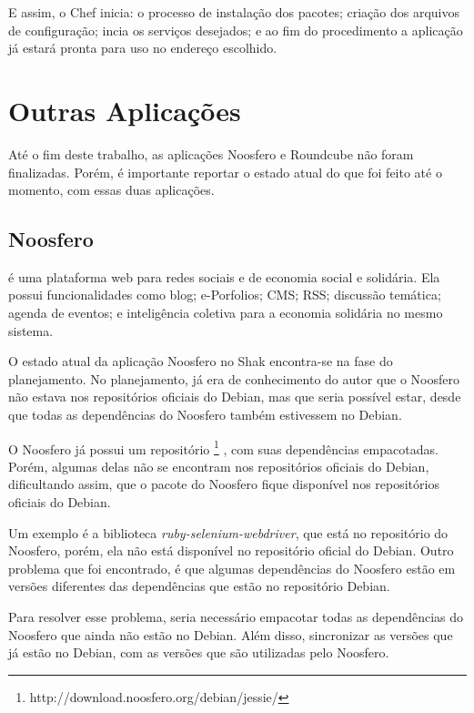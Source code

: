 E assim, o Chef inicia: o processo de instalação dos pacotes; criação dos arquivos
de configuração; incia os serviços desejados; e ao fim do procedimento a aplicação
já estará pronta para uso no endereço escolhido.

\section{Outras Aplicações}
\label{sub:appnencerradas}

Até o fim deste trabalho, as aplicações Noosfero e Roundcube não foram finalizadas. 
Porém, é importante reportar o estado atual do que foi feito até o momento,
com essas duas aplicações.

\subsection{Noosfero}
\label{subsub:noosfero}

 é uma plataforma web para redes sociais e 
de economia social e solidária. Ela possui funcionalidades como blog; e-Porfolios; 
CMS; RSS; discussão temática; agenda de eventos; e inteligência coletiva para a 
economia solidária no mesmo sistema.

O estado atual da aplicação Noosfero no Shak encontra-se
na fase do planejamento. No planejamento, já era de conhecimento do autor que o
Noosfero não estava nos repositórios oficiais do Debian, mas que seria possível estar, 
desde que todas as dependências do Noosfero também estivessem no Debian.

O Noosfero já possui um repositório \footnote{http://download.noosfero.org/debian/jessie/}
, com suas dependências empacotadas. Porém, algumas delas não se encontram nos repositórios
oficiais do Debian, dificultando assim, que o pacote do Noosfero fique disponível
nos repositórios oficiais do Debian. 

Um exemplo é a biblioteca \textit{ruby-selenium-webdriver}, que
está no repositório do Noosfero, porém, ela não está disponível no repositório oficial
do Debian. Outro problema que foi encontrado, é que algumas dependências do Noosfero
estão em versões diferentes das dependências que estão no repositório Debian.

Para resolver esse problema, seria necessário empacotar todas as dependências
do Noosfero que ainda não estão no Debian. Além disso, sincronizar as versões
que já estão no Debian, com as versões que são utilizadas pelo Noosfero.

